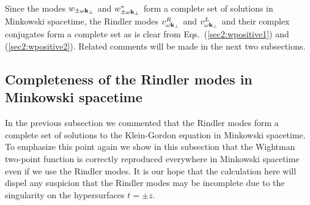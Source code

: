 \documentclass[12pt,nofootinbib,floatfix,aps,prd,showpacs,amsmath,amssymb,eqsecnum]{revtex4-2}
\begin{document}
Since the modes $w_{\pm \omega {\bf k}_\bot}$ and 
$w^*_{\pm \omega {\bf k}_\bot}$ form a complete set of solutions in
Minkowski spacetime, the Rindler modes
$v^R_{\omega{\bf k}_\perp}$ and $v^L_{\omega{\bf k}_\perp}$ and their
complex conjugates form a complete set as is clear from 
Eqs.~(\ref{sec2:wpositive1}) and (\ref{sec2:wpositive2}).  Related
comments will be made in the next two subsections.

\subsection{Completeness of the Rindler modes in Minkowski spacetime}
\label{section2:completeness}

In the previous subsection 
we commented that the Rindler modes form a
complete set of solutions to the Klein-Gordon equation in Minkowski
spacetime.  To emphasize this point again 
we show in this subsection that the
Wightman 
two-point function is correctly reproduced everywhere in Minkowski
spacetime even if we use the Rindler modes.
It is our hope that the calculation here will 
dispel any suspicion that the Rindler modes may be incomplete due 
to the singularity on the hypersurfaces $t=\pm z$. 
\end{document}
